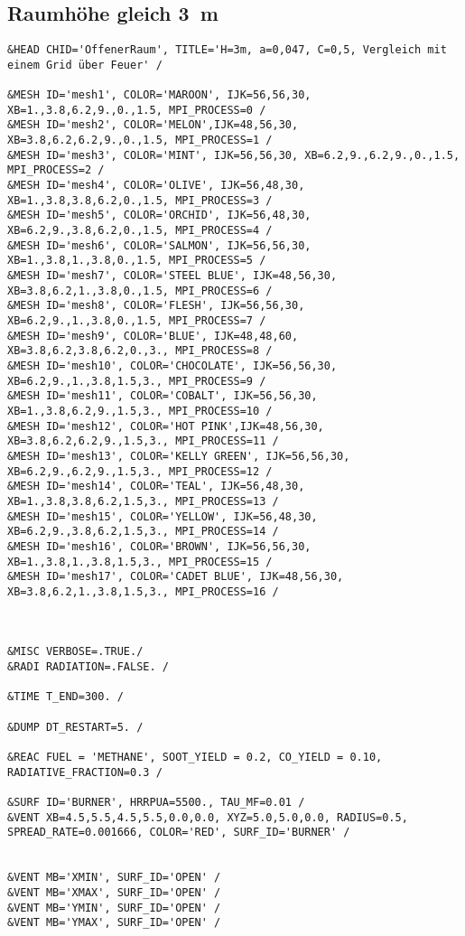 \subsection*{Raumhöhe gleich 3~m}
\begin{lstlisting}[emptylines=0, basicstyle=\tiny]
&HEAD CHID='OffenerRaum', TITLE='H=3m, a=0,047, C=0,5, Vergleich mit einem Grid über Feuer' /

&MESH ID='mesh1', COLOR='MAROON', IJK=56,56,30, XB=1.,3.8,6.2,9.,0.,1.5, MPI_PROCESS=0 /
&MESH ID='mesh2', COLOR='MELON',IJK=48,56,30, XB=3.8,6.2,6.2,9.,0.,1.5, MPI_PROCESS=1 /
&MESH ID='mesh3', COLOR='MINT', IJK=56,56,30, XB=6.2,9.,6.2,9.,0.,1.5, MPI_PROCESS=2 /
&MESH ID='mesh4', COLOR='OLIVE', IJK=56,48,30, XB=1.,3.8,3.8,6.2,0.,1.5, MPI_PROCESS=3 /
&MESH ID='mesh5', COLOR='ORCHID', IJK=56,48,30, XB=6.2,9.,3.8,6.2,0.,1.5, MPI_PROCESS=4 /
&MESH ID='mesh6', COLOR='SALMON', IJK=56,56,30, XB=1.,3.8,1.,3.8,0.,1.5, MPI_PROCESS=5 /
&MESH ID='mesh7', COLOR='STEEL BLUE', IJK=48,56,30, XB=3.8,6.2,1.,3.8,0.,1.5, MPI_PROCESS=6 /
&MESH ID='mesh8', COLOR='FLESH', IJK=56,56,30, XB=6.2,9.,1.,3.8,0.,1.5, MPI_PROCESS=7 /
&MESH ID='mesh9', COLOR='BLUE', IJK=48,48,60, XB=3.8,6.2,3.8,6.2,0.,3., MPI_PROCESS=8 /
&MESH ID='mesh10', COLOR='CHOCOLATE', IJK=56,56,30, XB=6.2,9.,1.,3.8,1.5,3., MPI_PROCESS=9 /
&MESH ID='mesh11', COLOR='COBALT', IJK=56,56,30, XB=1.,3.8,6.2,9.,1.5,3., MPI_PROCESS=10 /
&MESH ID='mesh12', COLOR='HOT PINK',IJK=48,56,30, XB=3.8,6.2,6.2,9.,1.5,3., MPI_PROCESS=11 /
&MESH ID='mesh13', COLOR='KELLY GREEN', IJK=56,56,30, XB=6.2,9.,6.2,9.,1.5,3., MPI_PROCESS=12 /
&MESH ID='mesh14', COLOR='TEAL', IJK=56,48,30, XB=1.,3.8,3.8,6.2,1.5,3., MPI_PROCESS=13 /
&MESH ID='mesh15', COLOR='YELLOW', IJK=56,48,30, XB=6.2,9.,3.8,6.2,1.5,3., MPI_PROCESS=14 /
&MESH ID='mesh16', COLOR='BROWN', IJK=56,56,30, XB=1.,3.8,1.,3.8,1.5,3., MPI_PROCESS=15 /
&MESH ID='mesh17', COLOR='CADET BLUE', IJK=48,56,30, XB=3.8,6.2,1.,3.8,1.5,3., MPI_PROCESS=16 /



&MISC VERBOSE=.TRUE./
&RADI RADIATION=.FALSE. /

&TIME T_END=300. /

&DUMP DT_RESTART=5. /

&REAC FUEL = 'METHANE', SOOT_YIELD = 0.2, CO_YIELD = 0.10, RADIATIVE_FRACTION=0.3 /

&SURF ID='BURNER', HRRPUA=5500., TAU_MF=0.01 /
&VENT XB=4.5,5.5,4.5,5.5,0.0,0.0, XYZ=5.0,5.0,0.0, RADIUS=0.5, SPREAD_RATE=0.001666, COLOR='RED', SURF_ID='BURNER' /


&VENT MB='XMIN', SURF_ID='OPEN' /  
&VENT MB='XMAX', SURF_ID='OPEN' /  
&VENT MB='YMIN', SURF_ID='OPEN' /  
&VENT MB='YMAX', SURF_ID='OPEN' / 
 

\end{lstlisting}
